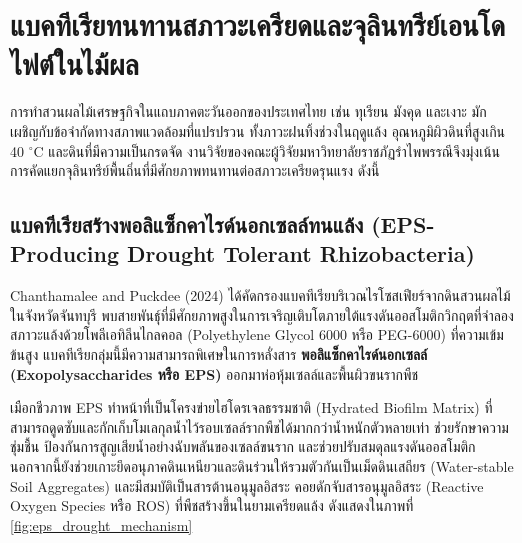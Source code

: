 \section{แบคทีเรียทนทานสภาวะเครียดและจุลินทรีย์เอนโดไฟต์ในไม้ผล}

การทำสวนผลไม้เศรษฐกิจในแถบภาคตะวันออกของประเทศไทย เช่น ทุเรียน มังคุด และเงาะ มักเผชิญกับข้อจำกัดทางสภาพแวดล้อมที่แปรปรวน ทั้งภาวะฝนทิ้งช่วงในฤดูแล้ง อุณหภูมิผิวดินที่สูงเกิน 40 $^{\circ}\text{C}$ และดินที่มีความเป็นกรดจัด งานวิจัยของคณะผู้วิจัยมหาวิทยาลัยราชภัฏรำไพพรรณีจึงมุ่งเน้นการคัดแยกจุลินทรีย์พื้นถิ่นที่มีศักยภาพทนทานต่อสภาวะเครียดรุนแรง ดังนี้

\subsection{แบคทีเรียสร้างพอลิแซ็กคาไรด์นอกเซลล์ทนแล้ง (EPS-Producing Drought Tolerant Rhizobacteria)}
Chanthamalee and Puckdee (2024) ได้คัดกรองแบคทีเรียบริเวณไรโซสเฟียร์จากดินสวนผลไม้ในจังหวัดจันทบุรี พบสายพันธุ์ที่มีศักยภาพสูงในการเจริญเติบโตภายใต้แรงดันออสโมติกวิกฤตที่จำลองสภาวะแล้งด้วยโพลีเอทิลีนไกลคอล (Polyethylene Glycol 6000 หรือ PEG-6000) ที่ความเข้มข้นสูง แบคทีเรียกลุ่มนี้มีความสามารถพิเศษในการหลั่งสาร \textbf{พอลิแซ็กคาไรด์นอกเซลล์ (Exopolysaccharides หรือ EPS)} ออกมาห่อหุ้มเซลล์และพื้นผิวขนรากพืช

เมือกชีวภาพ EPS ทำหน้าที่เป็นโครงข่ายไฮโดรเจลธรรมชาติ (Hydrated Biofilm Matrix) ที่สามารถดูดซับและกักเก็บโมเลกุลน้ำไว้รอบเซลล์รากพืชได้มากกว่าน้ำหนักตัวหลายเท่า ช่วยรักษาความชุ่มชื้น ป้องกันการสูญเสียน้ำอย่างฉับพลันของเซลล์ขนราก และช่วยปรับสมดุลแรงดันออสโมติก นอกจากนี้ยังช่วยเกาะยึดอนุภาคดินเหนียวและดินร่วนให้รวมตัวกันเป็นเม็ดดินเสถียร (Water-stable Soil Aggregates) และมีสมบัติเป็นสารต้านอนุมูลอิสระ คอยดักจับสารอนุมูลอิสระ (Reactive Oxygen Species หรือ ROS) ที่พืชสร้างขึ้นในยามเครียดแล้ง ดังแสดงในภาพที่ \ref{fig:eps_drought_mechanism}

